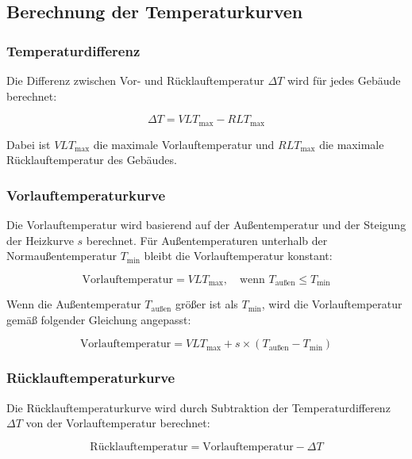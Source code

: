 \documentclass[a4paper,12pt]{article}
\begin{document}
\subsection{Berechnung der Temperaturkurven}

\subsubsection{Temperaturdifferenz}
Die Differenz zwischen Vor- und Rücklauftemperatur \( \Delta T \) wird für jedes Gebäude berechnet:

\[
\Delta T = VLT_{\text{max}} - RLT_{\text{max}}
\]

Dabei ist \( VLT_{\text{max}} \) die maximale Vorlauftemperatur und \( RLT_{\text{max}} \) die maximale Rücklauftemperatur des Gebäudes.

\subsubsection{Vorlauftemperaturkurve}
Die Vorlauftemperatur wird basierend auf der Außentemperatur und der Steigung der Heizkurve \( s \) berechnet. Für Außentemperaturen unterhalb der Normaußentemperatur \( T_{\text{min}} \) bleibt die Vorlauftemperatur konstant:

\[
\text{Vorlauftemperatur} = VLT_{\text{max}}, \quad \text{wenn } T_{\text{außen}} \leq T_{\text{min}}
\]

Wenn die Außentemperatur \( T_{\text{außen}} \) größer ist als \( T_{\text{min}} \), wird die Vorlauftemperatur gemäß folgender Gleichung angepasst:

\[
\text{Vorlauftemperatur} = VLT_{\text{max}} + s \times (T_{\text{außen}} - T_{\text{min}})
\]

\subsubsection{Rücklauftemperaturkurve}
Die Rücklauftemperaturkurve wird durch Subtraktion der Temperaturdifferenz \( \Delta T \) von der Vorlauftemperatur berechnet:

\[
\text{Rücklauftemperatur} = \text{Vorlauftemperatur} - \Delta T
\]




\end{document}
